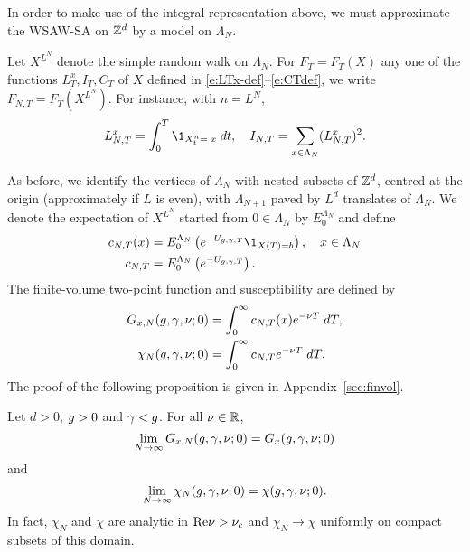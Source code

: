 In order to make use of the integral representation above, we must approximate the
WSAW-SA on ${ {{\mathbb Z}}^d }$ by a model on $\Lambda_N$.

Let $X^{L^N}$ denote the simple random walk on $\Lambda_N$.
For $F_T = F_T(X)$ any one of the functions $L_T^x,I_T,C_T$
of $X$ defined in \eqref{e:LTx-def}--\eqref{e:CTdef},
we write $F_{N,T} = F_T(X^{L^N})$. For instance, with $n=L^N$,
\begin{equation}
    L^x_{N,T} = \int_0^T \1_{X^{n}_t=\;x} \; dt,
    \quad I_{N,T} = \sum_{x \in \Lambda_N}(L_{N,T}^x)^2 .
\end{equation}

As before, we identify the vertices of $\Lambda_N$ with nested subsets of ${ {{\mathbb Z}}^d }$,
centred at the origin (approximately if $L$ is even),
with $\Lambda_{N+1}$ paved by $L^d$ translates of $\Lambda_N$.
We denote the expectation of $X^{L^N}$ started from $0 \in \Lambda_N$ by $E^{\Lambda_N}_0$
and define
\begin{align}
\label{e:cN}
c_{N,T}(x)
    &= E^{\Lambda_N}_0 \left( e^{-U_{\gcc,\gamma,T}} \1_{X(T)=b} \right),
    \quad x \in \Lambda_N \\
c_{N,T}
    &= E^{\Lambda_N}_0 \left( e^{-U_{\gcc,\gamma,T}} \right).
\end{align}
The finite-volume two-point function and susceptibility
are defined by
\begin{align}
G_{x,N}(g,\gamma,\nu; 0)
    &=
\int_0^\infty c_{N,T}(x) e^{-\nu T} \; dT, \\
\label{e:chiNdef-pre}
\chi_N(g, \gamma, \nu; 0)
    &=
\int_0^\infty c_{N,T} e^{-\nu T} \; dT.
\end{align}
The proof of the following proposition is given in Appendix~\ref{sec:finvol}.

\begin{prop}
\label{prop:finvol}
Let $d >0$, $g >0$ and $\gamma < g$. For all $\nu \in {\mathbb R}$,
\begin{equation}
\label{e:Givlc}
\lim_{N \rightarrow \infty}
G_{x,N}(g,\gamma,\nu; 0)
=
G_x(g,\gamma,\nu; 0)
\end{equation}
and
\begin{equation}
\label{e:chilim-pre}
\lim_{N\rightarrow\infty}\chi_N(g,\gamma,\nu; 0) =   \chi(g,\gamma,\nu; 0).
\end{equation}
In fact, $\chi_N$ and $\chi$ are analytic in ${\rm Re} \nu > \nu_c$ and
$\chi_N \to \chi$ uniformly on compact subsets of this domain.
\end{prop}

